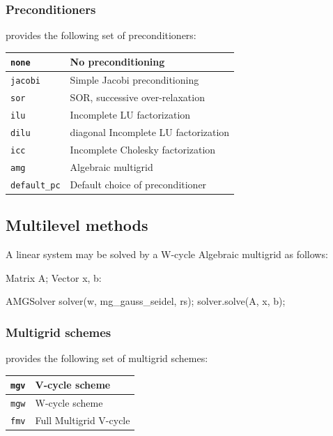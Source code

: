 \subsubsection{Preconditioners}

\dolfin{} provides the following set of preconditioners:

\begin{center}
\begin{tabular}{|l|l|}
\hline
\texttt{none}        & No preconditioning \\
\hline
\texttt{jacobi}      & Simple Jacobi preconditioning \\
\hline
\texttt{sor}         & SOR, successive over-relaxation \\
\hline
\texttt{ilu}         & Incomplete LU factorization \\
\hline
\texttt{dilu}        & diagonal Incomplete LU factorization \\
\hline
\texttt{icc}         & Incomplete Cholesky factorization \\
\hline
\texttt{amg}         & Algebraic multigrid  \\
\hline
\texttt{default\_pc} & Default choice of preconditioner \\
\hline
\end{tabular}
\end{center}

\subsection{Multilevel methods}
A linear system may be solved by a W-cycle Algebraic multigrid as follows:
\begin{code}
Matrix A;
Vector x, b:

AMGSolver solver(w, mg_gauss_seidel, rs);
solver.solve(A, x, b);
\end{code}

\subsubsection{Multigrid schemes}
\dolfin{} provides the following set of multigrid schemes:
\begin{center}
\begin{tabular}{|l|l|}
\hline
\texttt{mgv}        & V-cycle scheme\\
\hline
\texttt{mgw}      & W-cycle scheme\\
\hline
\texttt{fmv}       & Full Multigrid V-cycle\\
\hline
\end{tabular}
\end{center}
